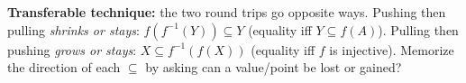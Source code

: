 \documentclass[11pt,a4paper]{article}
\begin{document}
\begin{methodbox}
\textbf{Transferable technique:} the two round trips go opposite ways. Pushing then pulling
\emph{shrinks or stays}: $f(f^{-1}(Y))\subseteq Y$ (equality iff $Y\subseteq f(A)$). Pulling then
pushing \emph{grows or stays}: $X\subseteq f^{-1}(f(X))$ (equality iff $f$ is injective). Memorize
the direction of each $\subseteq$ by asking \textquotedbl{}can a value/point be lost or
gained?\textquotedbl{}
\end{methodbox}
\end{document}
